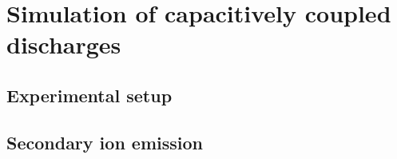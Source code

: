\chapter{Simulation of capacitively coupled discharges}

  \section{Experimental setup}

  \section{Secondary ion emission}
